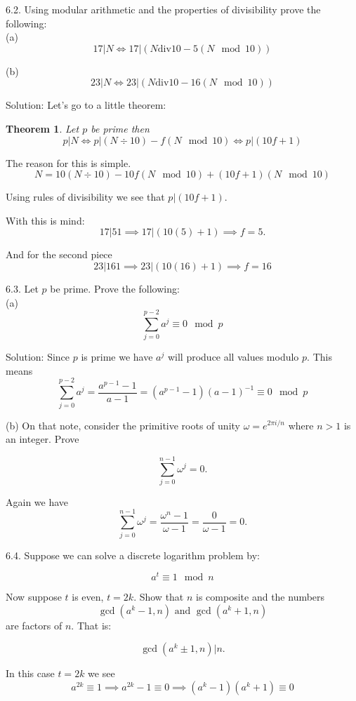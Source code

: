 \documentclass[16 pt]{amsart}
\newtheorem{thm}{Theorem}
\theoremstyle{definition}
\theoremstyle{remark}
\numberwithin{equation}{subsection}
\begin{document}
6.2. Using modular arithmetic and the properties of divisibility prove the following:\\


(a)
\[
17 | N \iff 17 |(N \text{div} 10 - 5(N\mod 10))
\]

(b)
\[
23 | N \iff 23 |(N \text{div} 10 - 16(N\mod 10))
\]



Solution:  Let's go to a little theorem:
\begin{thm}
Let $p$ be prime then
\[
p | N \iff p | (N\div 10) - f(N\mod 10) \iff p|(10f+1)
\]
\end{thm}


The reason for this is simple. 
\[
N = 10(N \div 10) - 10f(N\mod 10) + (10f+1)(N \mod 10)
\]

Using rules of divisibility we see that $p|(10f+1)$.

With this is mind:
\[
17 | 51 \implies 17|(10(5)+1) \implies f=5.
\]


And for the second piece
\[
23 | 161 \implies 23|(10(16)+1) \implies f=16
\]



6.3. Let $p$ be prime. Prove the following:\\

(a) 
\[
\sum_{j=0}^{p-2} a^j \equiv 0 \mod p
\]


Solution:  Since $p$ is prime we have $a^j$ will produce all values modulo $p$.  This means
\[
\sum_{j=0}^{p-2} a^j = \frac{a^{p-1}-1}{a-1} = (a^{p-1}-1)(a-1)^{-1} \equiv 0 \mod p
\]


(b) On that note, consider the primitive roots of unity $\omega = e^{2\pi i/n}$ where $n>1$ is an integer. Prove
 
\[
\sum_{j=0}^{n-1} \omega^j = 0.
\]


Again we have 
\[
\sum_{j=0}^{n-1} \omega^j = \frac{\omega^n -1}{\omega -1} = \frac{0}{\omega -1} = 0.
\]



6.4.  Suppose we can solve a discrete logarithm problem by:

\[
a^t \equiv 1 \mod n
\]

Now suppose $t$ is even, $t=2k$.  Show that $n$ is composite and the numbers
\[
\gcd(a^k-1,n) \text{  and  } \gcd(a^k+1,n)
\]
are factors of $n$.  That is:

\[
\gcd(a^k\pm 1,n) | n.
\]


In this case $t=2k$ we see
\[
a^{2k} \equiv 1 \implies a^{2k}-1 \equiv 0 \implies (a^k-1)(a^k+1) \equiv 0
\]
\end{document}
